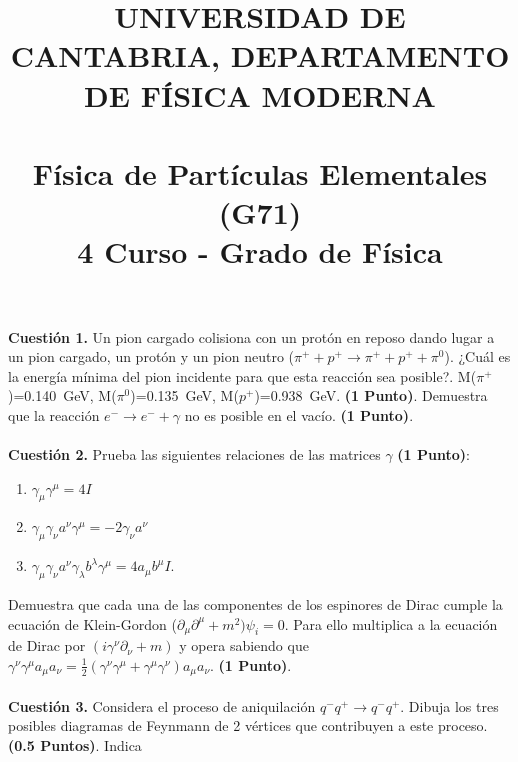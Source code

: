 \documentclass[paper=a4, fontsize=11pt]{scrartcl} %
\date{}
\title{	
\normalfont \normalsize 
\textsc{UNIVERSIDAD DE CANTABRIA, DEPARTAMENTO DE FÍSICA MODERNA} \\ [20pt] %
\horrule{0.5pt} \\[0.4cm] %
\huge Física de Partículas Elementales (G71) \\ %
\normalsize 4 Curso - Grado de Física
\horrule{2pt} \\[0.5cm] %
}
\numberwithin{equation}{section} %
\numberwithin{figure}{section} %
\numberwithin{table}{section} %
\begin{document}
\maketitle %

\vspace{-2.5cm}

\textbf{Cuestión 1.} Un pion cargado colisiona con un protón en reposo dando lugar a un pion cargado, un protón y un pion neutro ($\pi^{+} + p^{+}\rightarrow\pi^{+}+p^{+}+\pi^{0}$). ¿Cuál es la energía mínima
del pion incidente para que esta reacción sea posible?. M($\pi^{+}$)=0.140~GeV, M($\pi^{0}$)=0.135~GeV, M($p^{+}$)=0.938~GeV. \textbf{(1 Punto)}. Demuestra que la reacción $e^{-}\rightarrow e^{-}+\gamma$ no
es posible en el vacío. \textbf{(1 Punto)}.
\\
\\
\textbf{Cuestión 2.} Prueba las siguientes relaciones de las matrices $\gamma$ \textbf{(1 Punto)}: 
\begin{enumerate}
\item $\gamma_\mu\gamma^\mu=4I$
\item $\gamma_\mu\gamma_\nu a^{\nu}\gamma^{\mu}=-2\gamma_\nu a^{\nu}$
\item $\gamma_\mu\gamma_\nu a^{\nu}\gamma_\lambda b^{\lambda}\gamma^{\mu}=4 a_{\mu}b^{\mu}I$.
\end{enumerate}
Demuestra que cada una de las componentes de los espinores de Dirac cumple la ecuación de Klein-Gordon ($\partial_\mu\partial^{\mu} + m^2)\psi_i = 0$. Para ello multiplica a la ecuación de Dirac
por $(i\gamma^{\nu}\partial_{\nu} + m)$ y opera sabiendo que $\gamma^{\nu}\gamma^{\mu}a_{\mu}a_{\nu}=\frac{1}{2}(\gamma^{\nu}\gamma^{\mu} + \gamma^{\mu}\gamma^{\nu})a_{\mu}a_{\nu}$. \textbf{(1 Punto)}.
\\
\\
\textbf{Cuestión 3.} Considera el proceso de aniquilación $q^{-}q^{+}\rightarrow q^{-} q^{+}$. Dibuja los tres posibles diagramas de Feynmann de 2 vértices que contribuyen a este proceso. \textbf{(0.5 Puntos)}. Indica
\end{document}
